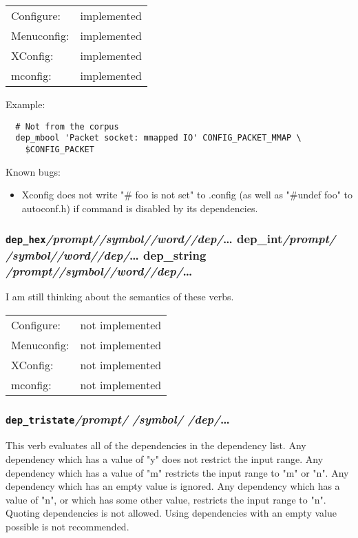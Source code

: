 \begin{tabular}{ll}
Configure:  &implemented\\
Menuconfig: &implemented\\
XConfig:    &implemented\\
mconfig:    &implemented\\
\end{tabular}

Example:
{\small\begin{verbatim}
  # Not from the corpus
  dep_mbool 'Packet socket: mmapped IO' CONFIG_PACKET_MMAP \
    $CONFIG_PACKET
\end{verbatim}}

Known bugs:
\begin{itemize}
\item Xconfig does not write "\# foo is not set" to .config (as well as
  "\#undef foo" to autoconf.h) if command is disabled by its dependencies.
\end{itemize}


\subsubsection{\texttt{dep\_hex}\quad \textit{/prompt/}\quad \textit{/symbol/}\quad \textit{/word/}\quad \textit{/dep/}\quad \dots\newline
dep\_int\quad \textit{/prompt/} \quad\textit{/symbol/}\quad \textit{/word/}\quad \textit{/dep/}\quad \dots\newline
dep\_string \quad\textit{/prompt/}\quad \textit{/symbol/}\quad \textit{/word/}\quad \textit{/dep/}\quad \dots}

I am still thinking about the semantics of these verbs.

\begin{tabular}{ll}
Configure:  &not implemented\\
Menuconfig: &not implemented\\
XConfig:    &not implemented\\
mconfig:    &not implemented\\
\end{tabular}



\subsubsection{\texttt{dep\_tristate}\quad \textit{/prompt/} \quad\textit{/symbol/} \quad\textit{/dep/}\quad \dots}

This verb evaluates all of the dependencies in the dependency list.
Any dependency which has a value of "y" does not restrict the input range.
Any dependency which has a value of "m" restricts the input range to
"m" or "n".  Any dependency which has an empty value is ignored.
Any dependency which has a value of "n", or which has some other value,
restricts the input range to "n".  Quoting dependencies is not allowed.
Using dependencies with an empty value possible is not recommended.

